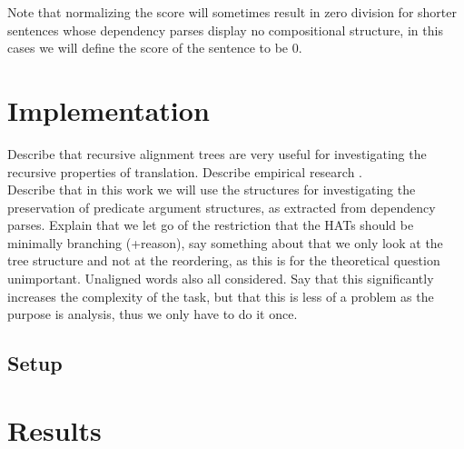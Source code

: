 \documentclass{report}
\theoremstyle{definition}
\theoremstyle{plain}
\begin{document}
Note that normalizing the score will sometimes result in zero division for shorter sentences whose dependency parses display no compositional structure, in this cases we will define the score of the sentence to be 0.


\chapter{Implementation}
\label{chapter:impl}
Describe that recursive alignment trees are very useful for investigating the recursive properties of translation. Describe empirical research \cite{simaan2013hats}.\\
Describe that in this work we will use the structures for investigating the preservation of predicate argument structures, as extracted from dependency parses. Explain that we let go of the restriction that the HATs should be minimally branching (+reason), say something about that we only look at the tree structure and not at the reordering, as this is for the theoretical question unimportant.
Unaligned words also all considered. Say that this significantly increases the complexity of the task, but that this is less of a problem as the purpose is analysis, thus we only have to do it once.



\section{Setup}



\chapter{Results}

\end{document}
